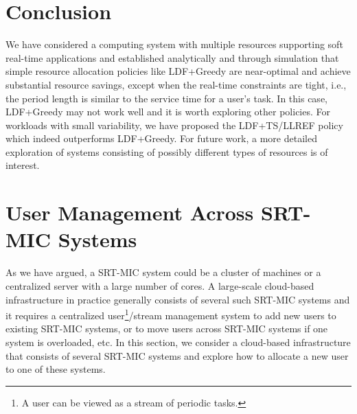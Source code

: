 \documentclass[prodmode,acmtompecs]{acmsmall}
\newcommand{\myComments}[1]{}
\newif\ifdissertation
\newif\ifhuawei
\newcommand{\dissertationStart}{\ifdissertation  \myComments{Dissertation version: }}
\newcommand{\huaweiStart}{\ifhuawei  \myComments{Huawei version: }}
\newcommand{\commentEnd}{\myComments{End}}
\begin{document}
\section{Conclusion}
We have considered a computing system with multiple resources supporting soft real-time applications and established analytically and through simulation that simple resource allocation policies like LDF+Greedy are near-optimal and achieve substantial resource savings, except when the real-time constraints are tight, i.e., the period length is similar to the service time for a user's task. 
In this case, LDF+Greedy may not work well and it is worth exploring other policies. 
For workloads with small variability, we have proposed the LDF+TS/LLREF policy which indeed outperforms LDF+Greedy. 
For future work, a more detailed exploration of systems consisting of possibly different types of resources is of interest. 



\huaweiStart
\section*{Acknowledgment}
This research was supported by Huawei Technologies Co. Ltd. 
The authors would like to thank Alan Gatherer, Zheng Lu, Haishan Zhu and Mattan Erez for their comments and feedbacks on this work. 
\commentEnd\fi

{}



\dissertationStart
\section{User Management Across SRT-MIC  Systems}
\myComments{Improve this based on prof's feedbacks. }
As we have argued, a SRT-MIC  system could be a cluster of machines or a centralized server with a large number of cores. A large-scale cloud-based infrastructure in practice generally consists of several such SRT-MIC  systems and it requires a centralized user\footnote{A user can be viewed as a stream of periodic tasks. }/stream management system to add new users to existing SRT-MIC  systems, or to move users across SRT-MIC  systems if one system is overloaded, etc. In this section, we consider a cloud-based infrastructure that consists of several SRT-MIC systems and explore how to allocate a new user to one of these systems. 
\end{document}
